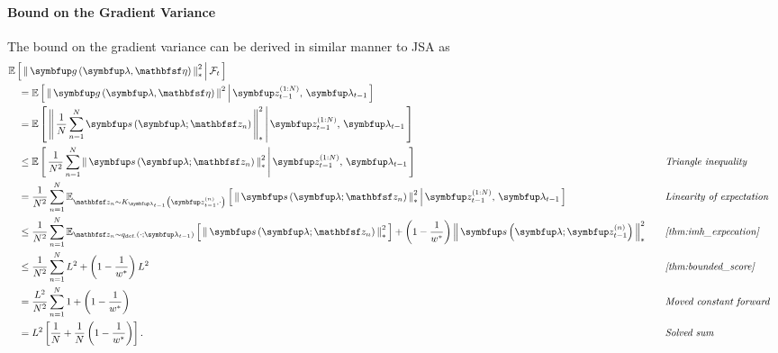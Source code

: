\begin{proofEnd}
  \paragraph{\textbf{Bound on the Gradient Variance}}
  The bound on the gradient variance can be derived in similar manner to JSA as
  \begin{alignat}{2}
    &\E{ \norm{ \vg\left(\vlambda, \rvveta\right) }^2_{*} \,\middle|\, \mathcal{F}_{t} }
    \nonumber
    \\
    &\quad=
    \E{ \norm{ \vg\left(\vlambda, \rvveta\right) }^2 \,\middle|\, \vz_{t-1}^{(1:N)},\, \vlambda_{t-1} }
    \nonumber
    \\
    &\quad=
    \E{ \norm{ \frac{1}{N}\sum^{N}_{n=1} \vs\left(\vlambda; \rvvz_{n}\right) }^2_{*} \,\middle|\, \vz_{t-1}^{(1:N)},\, \vlambda_{t-1} }
    \nonumber
    \\
    &\quad\leq
    \E{  \frac{1}{N^2} \sum^{N}_{n=1} \norm{\vs\left(\vlambda; \rvvz_{n}\right) }^2_{*} \,\middle|\, \vz_{t-1}^{(1:N)},\, \vlambda_{t-1} }
    &&\quad\text{\textit{Triangle inequality}}
    \nonumber
    \\
    &\quad=
    \frac{1}{N^2}\sum^{N}_{n=1} \Esub{\rvvz_{n} \sim K_{\vlambda_{t-1}}\left(\vz_{t-1}^{(n)}, \cdot\right)}{ \norm{\vs\left(\vlambda; \rvvz_{n}\right) }^2_{*} \,\middle|\,  \vz_{t-1}^{(1:N)},\, \vlambda_{t-1} }
    &&\quad\text{\textit{Linearity of expectation}}
    \nonumber
    \\
    &\quad\leq
    \frac{1}{N^2}\sum^{N}_{n=1}
      \Esub{\rvvz_n \sim q_{\text{def.}}\left(\cdot;\vlambda_{t-1}\right)}{ \norm{\vs\left(\vlambda; \rvvz_n \right)}_{*}^2 }
      +
      {\left(1 - \frac{1}{w^*}\right)} \, \norm{\vs\left(\vlambda; \vz_{t-1}^{(n)} \right)}_{*}^2
    &&\quad\text{\textit{\cref{thm:imh_expecation}}}
    \nonumber
    \\
    &\quad\leq
    \frac{1}{N^2}\sum^{N}_{n=1}
        L^2 + {\left(1 - \frac{1}{w^*}\right)} \, L^2
    &&\quad\text{\textit{\cref{thm:bounded_score}}}
    \nonumber
    \\
    &\quad=
    \frac{L^2}{N^2} \sum^{N}_{n=1}
      1 + {\left(1 - \frac{1}{w^*}\right)}
    \nonumber
    &&\quad\text{\textit{Moved constant forward}}
    \\
    &\quad=
    L^2 \left[ \frac{1}{N} + \frac{1}{N}\,{\left(1 - \frac{1}{w^*}\right)} \right].
    \nonumber
    &&\quad\text{\textit{Solved sum}}
  \end{alignat}
\end{proofEnd}

